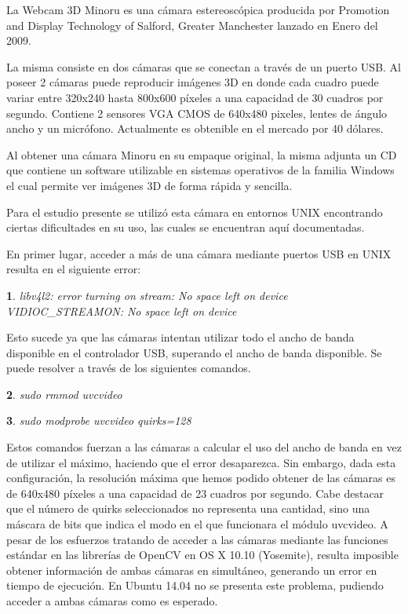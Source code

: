 \documentclass[11pt,a4paper,titlepage]{article}
\newtheorem{mytheorem}{}
\newenvironment{theorem}%
  {\begin{lrbox}{\thmbox}%
   \begin{minipage}{\dimexpr\linewidth-2\fboxsep}
   \begin{mytheorem}}%
  {\end{mytheorem}%
   \end{minipage}%
   \end{lrbox}%
   \begin{trivlist}
     \item[]\colorbox{lightgray}{\usebox\thmbox}
   \end{trivlist}}
\begin{document}
La Webcam 3D Minoru es una cámara estereoscópica producida por Promotion and Display Technology of Salford, Greater Manchester lanzado en Enero del 2009.

La misma consiste en dos cámaras que se conectan a través de un puerto USB. Al poseer 2 cámaras puede reproducir imágenes 3D en donde cada cuadro puede variar entre 320x240 hasta 800x600 píxeles a una capacidad de 30 cuadros por segundo. Contiene 2 sensores VGA CMOS de 640x480 pixeles, lentes de ángulo ancho y un micrófono. Actualmente es obtenible en el mercado por 40 dólares.

Al obtener una cámara Minoru en su empaque original, la misma adjunta un CD que contiene un software utilizable en sistemas operativos de la familia Windows el cual permite ver imágenes 3D de forma rápida y sencilla.

Para el estudio presente se utilizó esta cámara en entornos UNIX encontrando ciertas dificultades en su uso, las cuales se encuentran aquí documentadas.

En primer lugar, acceder a más de una cámara mediante puertos USB en UNIX resulta en el siguiente error:

\begin{theorem}
libv4l2: error turning on stream: No space left on device VIDIOC\_STREAMON: No space left on device
\end{theorem}

Esto sucede ya que las cámaras intentan utilizar todo el ancho de banda disponible en el controlador USB, superando el ancho de banda disponible. Se puede resolver a través de los siguientes comandos.

\begin{theorem}
sudo rmmod uvcvideo 
\end{theorem}

\begin{theorem}
sudo modprobe uvcvideo quirks=128
\end{theorem}

Estos comandos fuerzan a las cámaras a calcular el uso del ancho de banda en vez de utilizar el máximo, haciendo que el error desaparezca. Sin embargo, dada esta configuración, la resolución máxima que hemos podido obtener de las cámaras es de 640x480 píxeles a una capacidad de 23 cuadros por segundo. Cabe destacar que el número de quirks seleccionados no representa una cantidad, sino una máscara de bits que indica el modo en el que funcionara el módulo uvcvideo.
A pesar de los esfuerzos tratando de acceder a las cámaras mediante las funciones estándar en las librerías de OpenCV en OS X 10.10 (Yosemite), resulta imposible obtener información de ambas cámaras en simultáneo, generando un error en tiempo de ejecución. En Ubuntu 14.04 no se presenta este problema, pudiendo acceder a ambas cámaras como es esperado.
\end{document}
